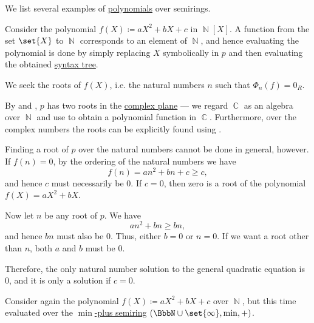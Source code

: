 \begin{example}\label{ex:def:polynomial_algebra}
  We list several examples of \hyperref[def:polynomial_algebra]{polynomials} over semirings.
  \begin{thmenum}
     Consider the polynomial \( f(X) \coloneqq aX^2 + bX + c \) in \( \BbbN[X] \). A function from the set \( \set{ X } \) to \( \BbbN \) corresponds to an element of \( \BbbN \), and hence evaluating the polynomial is done by simply replacing \( X \) symbolically in \( p \) and then evaluating the obtained \hyperref[rem:binary_operation_syntax_trees]{syntax tree}.

    We seek the roots of \( f(X) \), i.e. the natural numbers \( n \) such that \( \Phi_n(f) = 0_R \).

    By  and , \( p \) has two roots in the \hyperref[def:complex_numbers]{complex plane} --- we regard \( \BbbC \) as an algebra over \( \BbbN \) and use  to obtain a polynomial function in \( \BbbC \). Furthermore, over the complex numbers the roots can be explicitly found using .

    Finding a root of \( p \) over the natural numbers cannot be done in general, however. If \( f(n) = 0 \), by the ordering of the natural numbers we have
    \begin{equation*}
      f(n) = an^2 + bn + c \geq c,
    \end{equation*}
    and hence \( c \) must necessarily be \( 0 \). If \( c = 0 \), then zero is a root of the polynomial \( f(X) = aX^2 + bX \).

    Now let \( n \) be any root of \( p \). We have
    \begin{equation*}
      an^2 + bn \geq bn,
    \end{equation*}
    and hence \( bn \) must also be \( 0 \). Thus, either \( b = 0 \) or \( n = 0 \). If we want a root other than \( n \), both \( a \) and \( b \) must be \( 0 \).

    Therefore, the only natural number solution to the general quadratic equation is \( 0 \), and it is only a solution if \( c = 0 \).

     Consider again the polynomial \( f(X) \coloneqq aX^2 + bX + c \) over \( \BbbN \), but this time evaluated over the \hyperref[def:tropical_semiring]{\( \min \)-plus semiring} \( (\BbbN \cup \set{ \infty }, \min, +) \).


\end{thmenum}
\end{example}
